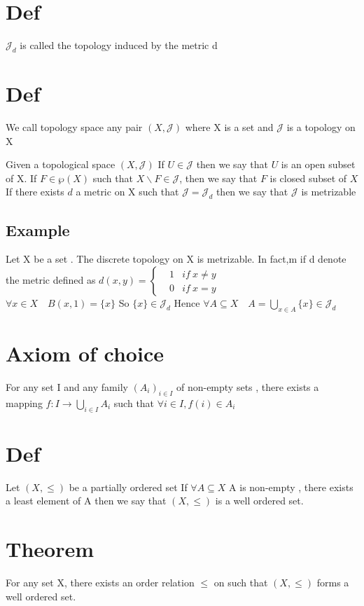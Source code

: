 \documentclass{book}
\begin{document}
\section{Def}
$\mathcal{J} _d$ is called the topology induced by the metric d
\section{Def}
We call topology space any pair $(X,\mathcal{J})$ where X is a set and $\mathcal{J}$ is a topology on X

Given a topological space $(X,\mathcal{J})$ If $U\in \mathcal{J}$ then we say that $U$ is an open subset of X. If $F\in \wp(X)$ such that $X\backslash F\in \mathcal{J}$, then we say that $F$ is closed subset of $X$\\
If there exists $d$ a metric on X such that $\mathcal{J}=\mathcal{J}_d$ then we say that $\mathcal{J}$ is metrizable
\subsection{Example}
Let X be a set . The discrete topology on X is metrizable. In fact,m if d denote the metric defined as $d(x,y)=\left\{\begin{aligned}
    &1 & if\ x\not=y\\
    &0 & if\ x=y
    \end{aligned}\right.$\\
$\forall x\in X\quad B(x,1)=\{x\}$ So $\{x\}\in \mathcal{J}_d$ Hence $\forall A\subseteq X\quad A=\bigcup\limits_{x\in A}\{x\}\in \mathcal{J}_d$ 
\section{Axiom of choice}
For any set I and any family $(A_i)_{i\in I}$ of non-empty sets , there exists a mapping $f:I\rightarrow \bigcup\limits_{i\in I}A_i$ such that $\forall i\in I, f(i)\in A_i$
\section{Def} Let $(X,\leq)$ be a partially ordered set If $\forall A\subseteq X$ A is non-empty , there exists a least element of A then we say that $(X,\leq)$ is a well ordered set.
\section{Theorem }
For any set X, there exists an order relation $\leq$ on such that $(X,\leq)$ forms a well ordered set.
\end{document}

